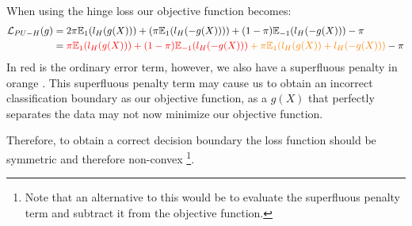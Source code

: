 When using the hinge loss our objective function becomes:
\begin{align}
    \mathcal{L}_{PU-H}(g) &{}= 2 \pi \mathbb{E}_{1}(l_{H}(g(X))) + (\pi \mathbb{E}_{1}(l_{H}(-g(X)))) + (1-\pi) \mathbb{E}_{-1} (l_{H}(-g(X))) - \pi \\
    &= \color{red} \pi \mathbb{E}_{1}(l_{H}(g(X))) + (1-\pi) \mathbb{E}_{-1}(l_{H}(-g(X))) 
    \color{orange} + \pi \mathbb{E}_{1}(l_{H}(g(X)) + l_{H}(-g(X)) ) 
    \color{black} - \pi
\end{align}
In \color{red}red \color{black} is the ordinary error term, however, we also have a superfluous penalty in \color{orange}orange \color{black}. This superfluous penalty term may cause us to obtain an incorrect classification boundary as our objective function, as a $g(X)$ that perfectly separates the data may not now minimize our objective function. 

Therefore, to obtain a correct decision boundary the loss function should be symmetric and therefore non-convex \footnote{Note that an alternative to this would be to evaluate the superfluous penalty term and subtract it from the objective function.}. 

